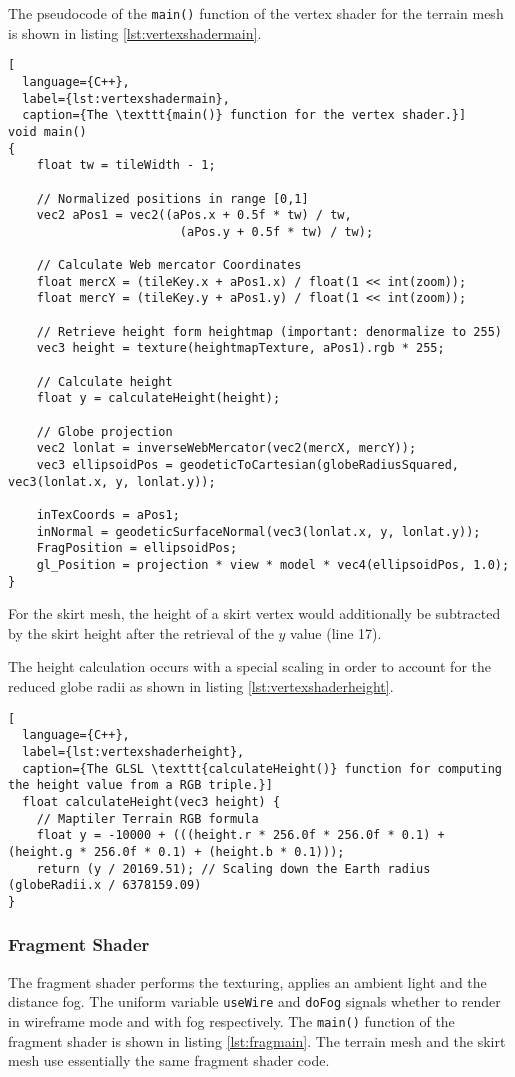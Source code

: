 The pseudocode of the \texttt{main()} function of the vertex shader for the terrain mesh is shown in listing \ref{lst:vertexshadermain}.

\begin{lstlisting}[
  language={C++},
  label={lst:vertexshadermain},
  caption={The \texttt{main()} function for the vertex shader.}]
void main()
{
    float tw = tileWidth - 1;

    // Normalized positions in range [0,1]
    vec2 aPos1 = vec2((aPos.x + 0.5f * tw) / tw,
                        (aPos.y + 0.5f * tw) / tw);

    // Calculate Web mercator Coordinates
    float mercX = (tileKey.x + aPos1.x) / float(1 << int(zoom));
    float mercY = (tileKey.y + aPos1.y) / float(1 << int(zoom));

    // Retrieve height form heightmap (important: denormalize to 255)
    vec3 height = texture(heightmapTexture, aPos1).rgb * 255;

    // Calculate height
    float y = calculateHeight(height);

    // Globe projection
    vec2 lonlat = inverseWebMercator(vec2(mercX, mercY));
    vec3 ellipsoidPos = geodeticToCartesian(globeRadiusSquared, vec3(lonlat.x, y, lonlat.y));

    inTexCoords = aPos1;
    inNormal = geodeticSurfaceNormal(vec3(lonlat.x, y, lonlat.y));
    FragPosition = ellipsoidPos;
    gl_Position = projection * view * model * vec4(ellipsoidPos, 1.0);
}
\end{lstlisting}
For the skirt mesh, the height of a skirt vertex would additionally be subtracted 
by the skirt height after the retrieval of the $y$ value (line 17).

The height calculation occurs with a special scaling in order to account 
for the reduced globe radii as shown in listing \ref{lst:vertexshaderheight}.

\begin{lstlisting}[
  language={C++},
  label={lst:vertexshaderheight},
  caption={The GLSL \texttt{calculateHeight()} function for computing the height value from a RGB triple.}]
  float calculateHeight(vec3 height) {
    // Maptiler Terrain RGB formula
    float y = -10000 + (((height.r * 256.0f * 256.0f * 0.1) + (height.g * 256.0f * 0.1) + (height.b * 0.1)));
    return (y / 20169.51); // Scaling down the Earth radius (globeRadii.x / 6378159.09)
}
\end{lstlisting}

\subsubsection{Fragment Shader}
The fragment shader performs the texturing,
applies an ambient light and the distance fog.
The uniform variable \texttt{useWire} and \texttt{doFog}
signals whether to render in wireframe mode and with fog respectively.
The \texttt{main()} function of the fragment shader is 
shown in listing \ref{lst:fragmain}. The terrain mesh 
and the skirt mesh use essentially the same 
fragment shader code.

